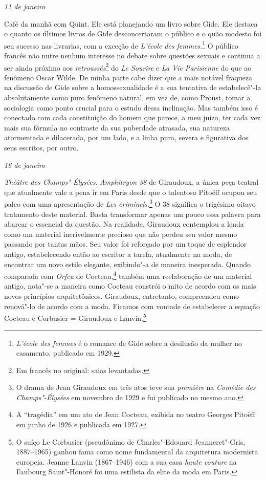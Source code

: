 \bigskip

\begin{flushright}
\emph{11 de janeiro}
\end{flushright}

Café da manhã com Quint. Ele está planejando um
livro sobre Gide. Ele destaca o quanto os últimos livros de Gide
desconcertaram o público e o quão modesto foi seu sucesso nas livrarias,
com a exceção de \emph{L'école des femmes}.\footnote{\emph{L'école
  des femmes} é o romance de Gide sobre a desilusão da mulher no
  casamento, publicado em 1929. \versal{[N.~O.]}} O público francês não nutre nenhum
interesse no debate sobre questões sexuais e continua a ser ainda próximo aos
\emph{retroussés}\footnote{Em francês no original: saias levantadas. \versal{[N.~T.]}} do \emph{Le Sourire} e \emph{La Vie Parisienne} do
que ao fenômeno Oscar Wilde. De minha parte cabe dizer que a mais
notável fraqueza na discussão de Gide sobre a homossexualidade é a sua
tentativa de estabelecê"-la absolutamente como puro fenômeno natural, em
vez de, como Proust, tomar a sociologia como ponto crucial para o estudo
dessa inclinação. Mas também isso é conectado com cada constituição do
homem que parece, a meu juízo, ter cada vez mais sua fórmula no
contraste da sua puberdade atrasada, sua natureza atormentada e
dilacerada, por um lado, e a linha pura, severa e figurativa dos seus
escritos, por outro.

\begin{flushright}
\emph{16 de janeiro}
\end{flushright}

\emph{Théâtre des Champs"-Élysées}. \emph{Amphitryon 38} de
Giraudoux, a única peça teatral que atualmente vale a pena ir em Paris
desde que o talentoso Pitoëff ocupou seu palco com uma apresentação de
\emph{Les criminels}.\footnote{O drama de Jean Giraudoux em três
  atos teve sua \emph{première} na \emph{Comédie des Champs"-Élysées} em
  novembro de 1929 e fui publicado no mesmo ano. \versal{[N.~O.]}} O 38 significa o
trigésimo oitavo tratamento deste material. Basta transformar apenas um
pouco essa palavra para abarcar o essencial da questão. Na realidade, Giraudoux
contemplou a lenda como um material incrivelmente precioso que não
perdeu seu valor mesmo passando por tantas mãos. Seu valor foi
reforçado por um toque de esplendor antigo, estabelecendo então ao
escritor a tarefa, atualmente na moda, de encontrar um novo estilo
elegante, exibindo"-a de maneira inesperada. Quando comparada com
\emph{Orfeu} de Cocteau,\footnote{A ``tragédia'' em um ato de
  Jean Cocteau, exibida no teatro Georges Pitoëff em junho de 1926 e
  publicada em 1927. \versal{[N.~O.]}} também uma reelaboração de um material antigo,
nota"-se a maneira como Cocteau constrói o mito de acordo com os mais
novos princípios arquitetônicos. Giraudoux, entretanto, compreendeu como
renová"-lo de acordo com a moda. Ficamos com vontade de estabelecer a
equação Cocteau e Corbusier = Giraudoux e Lanvin.\footnote{O suíço Le
  Corbusier (pseudônimo de Charles"-Edouard Jeanneret"-Gris, 1887--1965) ganhou
  fama como nome fundamental da arquitetura modernista europeia. Jeanne
  Lanvin (1867--1946) com a sua casa \emph{haute couture} na Faubourg
  Saint"-Honoré foi uma estilista da elite da moda em Paris. \versal{[N.~O.]}}


